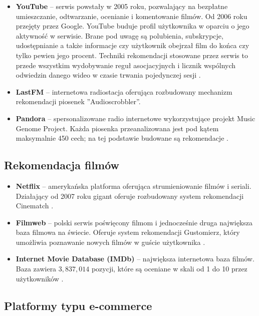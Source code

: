 \documentclass[twoside]{iisthesis}
\begin{document}
	 \begin{itemize}
	 	\item \textbf{YouTube} -- serwis powstały w 2005 roku, pozwalający na bezpłatne umieszczanie, odtwarzanie, ocenianie i komentowanie filmów. Od 2006 roku przejęty przez Google. YouTube buduje profil użytkownika w oparciu o jego aktywność w serwisie. Brane pod uwagę są polubienia, subskrypcje, udostępnianie a także informacje czy użytkownik obejrzał film do końca czy tylko pewien jego procent. Techniki rekomendacji stosowane przez serwis to przede wszystkim wydobywanie reguł asocjacyjnych i licznik wspólnych odwiedzin danego wideo w czasie trwania pojedynczej sesji \cite{id:TheYouTubeVideoRecommendationSystem}. 
	 	\item \textbf{LastFM } -- internetowa radiostacja oferująca rozbudowany mechanizm rekomendacji piosenek ''Audioscrobbler''.   
	 	\item \textbf{Pandora}	-- spersonalizowane radio internetowe wykorzystujące projekt Music Genome Project. Każda piosenka przeanalizowana jest pod kątem maksymalnie 450 cech; na tej podstawie budowane są rekomendacje \cite{id:mgp}.
	 	
	 \end{itemize}
	 
	 \subsection{Rekomendacja filmów}
	 \begin{itemize}
	 	\item \textbf{Netflix} -- amerykańska platforma oferująca strumieniowanie filmów i seriali. Działający od 2007 roku gigant oferuje rozbudowany system rekomendacji Cinematch \cite{id:aStreamOfMovies}. 
	 	\item \textbf{Filmweb} -- polski serwis poświęcony filmom i jednocześnie druga największa baza filmowa na świecie. Oferuje system rekomendacji Gustomierz, który umożliwia poznawanie nowych filmów w guście użytkownika \cite{id:filmwebfaq}.
	 	\item \textbf{Internet Movie Database (IMDb)} -- największa internetowa baza filmów. Baza zawiera $3,837,014$ pozycji, które są oceniane w skali od 1 do 10 przez użytkowników \cite{id:imdbstats}.
	 \end{itemize}
	 
	 \subsection{Platformy typu e-commerce}
	 
\end{document}
